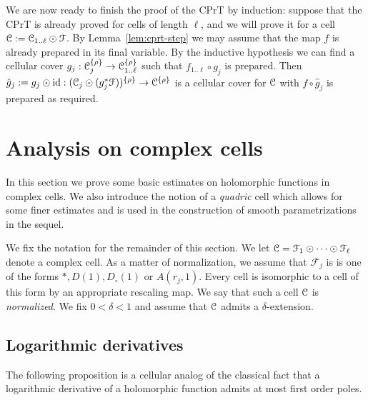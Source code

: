\documentclass[reqno]{amsart}
\renewcommand\~[1]{\widetilde{#1}}
\def\cF{{\mathcal F}} \def\cL{{\mathcal L}} \def\cR{{\mathcal R}}
\def\id{\operatorname{id}}
\def\he#1{{\{#1\}}}
\def\hrho{{\he\rho}}
\begin{document}
We are now ready to finish the proof of the CPrT by induction: suppose
that the CPrT is already proved for cells of length $\ell$, and we
will prove it for a cell $\cC:=\cC_{1..\ell}\odot\cF$. By
Lemma~\ref{lem:cprt-step} we may assume that the map $f$ is already
prepared in its final variable. By the inductive hypothesis we can
find a cellular cover $g_j:\cC_j^\hrho\to\cC_{1..\ell}^\hrho$ such
that $f_{1..\ell}\circ g_j$ is prepared. Then
$\hat g_j:=g_j\odot\id:(\cC_j\odot(g_j^*\cF))^\hrho\to\cC^\hrho$ is a
cellular cover for ${\mathcal C}$ with $f\circ\hat g_j$ is prepared as
required.



\section{Analysis on complex cells}

In this section we prove some basic estimates on holomorphic functions
in complex cells. We also introduce the notion of a \emph{quadric}
cell which allows for some finer estimates and is used in the
construction of smooth parametrizations in the sequel.

We fix the notation for the remainder of this section. We let
$\cC=\cF_1\odot\cdots\odot\cF_\ell$ denote a complex cell. As a matter
of normalization, we assume that $\cF_j$ is is one of the forms
$*,D(1),D_\circ(1)$ or $A(r_j,1)$. Every cell is isomorphic to a cell
of this form by an appropriate rescaling map. We say that such a cell
${\mathcal C}$ is \emph{normalized}. We fix $0<\delta<1$ and assume that ${\mathcal C}$
admits a $\delta$-extension.

\subsection{Logarithmic derivatives}

The following proposition is a cellular analog of the classical fact
that a logarithmic derivative of a holomorphic function admits at most
first order poles.
\end{document}
